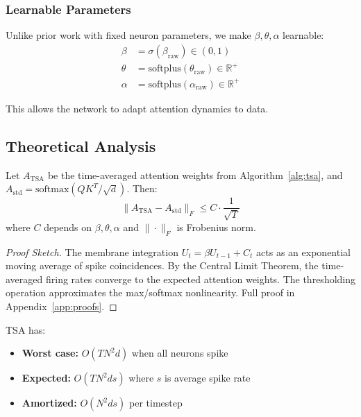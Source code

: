 \documentclass{article}
\begin{document}
\subsubsection{Learnable Parameters}

Unlike prior work with fixed neuron parameters, we make $\beta, \theta, \alpha$ learnable:
\begin{align}
    \beta &= \sigma(\beta_{\text{raw}}) \in (0, 1) \\
    \theta &= \text{softplus}(\theta_{\text{raw}}) \in \mathbb{R}^+ \\
    \alpha &= \text{softplus}(\alpha_{\text{raw}}) \in \mathbb{R}^+
\end{align}

This allows the network to adapt attention dynamics to data.

\subsection{Theoretical Analysis}

\begin{theorem}
\label{thm:softmax_approx}
Let $A_{\text{TSA}}$ be the time-averaged attention weights from Algorithm~\ref{alg:tsa}, and $A_{\text{std}} = \text{softmax}(QK^T/\sqrt{d})$. Then:
\begin{equation}
    \|A_{\text{TSA}} - A_{\text{std}}\|_F \leq C \cdot \frac{1}{\sqrt{T}}
\end{equation}
where $C$ depends on $\beta, \theta, \alpha$ and $\|\cdot\|_F$ is Frobenius norm.
\end{theorem}

\begin{proof}[Proof Sketch]
The membrane integration $U_t = \beta U_{t-1} + C_t$ acts as an exponential moving average of spike coincidences. By the Central Limit Theorem, the time-averaged firing rates converge to the expected attention weights. The thresholding operation approximates the max/softmax nonlinearity. Full proof in Appendix~\ref{app:proofs}.
\end{proof}

\begin{theorem}
\label{thm:complexity}
TSA has:
\begin{itemize}
    \item \textbf{Worst case:} $O(TN^2d)$ when all neurons spike
    \item \textbf{Expected:} $O(TN^2ds)$ where $s$ is average spike rate
    \item \textbf{Amortized:} $O(N^2ds)$ per timestep
\end{itemize}
\end{theorem}
\end{document}

